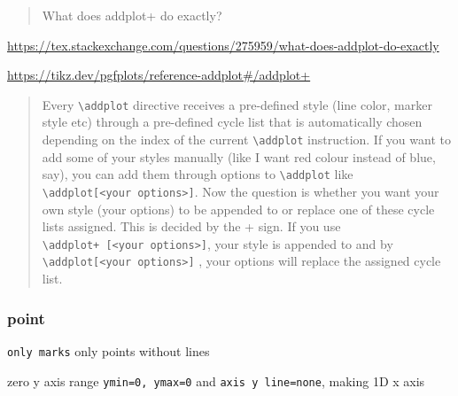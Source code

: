 \documentclass[
]{book}
\theoremstyle{definition}
\theoremstyle{definition}
\theoremstyle{definition}
\theoremstyle{definition}
\theoremstyle{remark}
\begin{document}
\begin{quote}
What does addplot+ do exactly?
\end{quote}

\url{https://tex.stackexchange.com/questions/275959/what-does-addplot-do-exactly}

\url{https://tikz.dev/pgfplots/reference-addplot\#/addplot+}

\begin{quote}
Every \texttt{\textbackslash{}addplot} directive receives a pre-defined style (line color, marker style etc) through a pre-defined cycle list that is automatically chosen depending on the index of the current \texttt{\textbackslash{}addplot} instruction. If you want to add some of your styles manually (like I want red colour instead of blue, say), you can add them through options to \texttt{\textbackslash{}addplot} like \texttt{\textbackslash{}addplot{[}\textless{}your\ options\textgreater{}{]}}. Now the question is whether you want your own style (your options) to be appended to or replace one of these cycle lists assigned. This is decided by the + sign. If you use \texttt{\textbackslash{}addplot+\ {[}\textless{}your\ options\textgreater{}{]}}, your style is appended to and by \texttt{\textbackslash{}addplot{[}\textless{}your\ options\textgreater{}{]}} , your options will replace the assigned cycle list.
\end{quote}

\subsubsection{point}\label{point}

\texttt{only\ marks} only points without lines

zero y axis range \texttt{ymin=0,\ ymax=0} and \texttt{axis\ y\ line=none}, making 1D x axis
\end{document}
